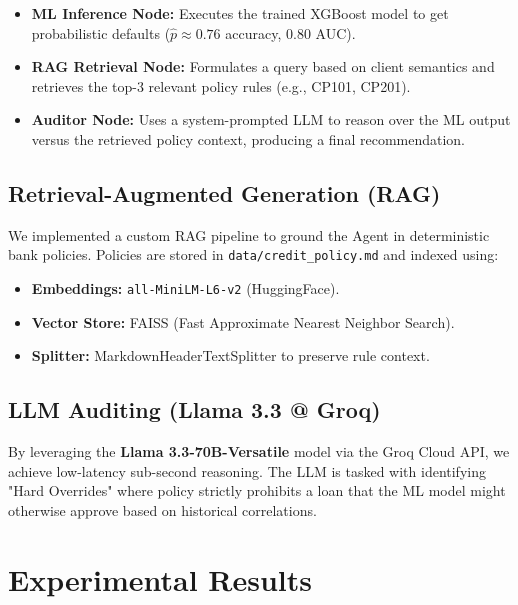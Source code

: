 \documentclass[12pt,a4paper]{article}
\newcommand{\code}[1]{\texttt{#1}}
\begin{document}
\begin{itemize}
    \item \textbf{ML Inference Node:} Executes the trained XGBoost model to get
          probabilistic defaults ($\hat{p} \approx 0.76$ accuracy, $0.80$ AUC).
    \item \textbf{RAG Retrieval Node:} Formulates a query based on client semantics
          and retrieves the top-3 relevant policy rules (e.g., CP101, CP201).
    \item \textbf{Auditor Node:} Uses a system-prompted LLM to reason over the
          ML output versus the retrieved policy context, producing a final
          recommendation.
\end{itemize}

\subsection{Retrieval-Augmented Generation (RAG)}

We implemented a custom RAG pipeline to ground the Agent in deterministic bank
policies. Policies are stored in \code{data/credit_policy.md} and indexed using:
\begin{itemize}
    \item \textbf{Embeddings:} \code{all-MiniLM-L6-v2} (HuggingFace).
    \item \textbf{Vector Store:} FAISS (Fast Approximate Nearest Neighbor Search).
    \item \textbf{Splitter:} MarkdownHeaderTextSplitter to preserve rule context.
\end{itemize}

\subsection{LLM Auditing (Llama 3.3 @ Groq)}

By leveraging the \textbf{Llama 3.3-70B-Versatile} model via the Groq Cloud API, we
achieve low-latency sub-second reasoning. The LLM is tasked with identifying
"Hard Overrides" where policy strictly prohibits a loan that the ML model
might otherwise approve based on historical correlations.

\newpage

\section{Experimental Results}
\end{document}
